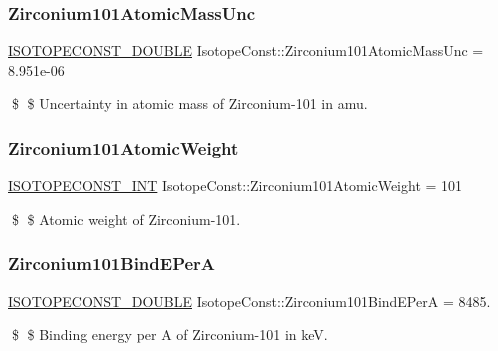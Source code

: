 \subsubsection{\texorpdfstring{Zirconium101\+Atomic\+Mass\+Unc}{Zirconium101AtomicMassUnc}}
{\footnotesize\ttfamily \mbox{\hyperlink{group___isotope_const-_macros_ga8f45a7272ce02c0b4c65c44636ed719a}{I\+S\+O\+T\+O\+P\+E\+C\+O\+N\+S\+T\+\_\+\+D\+O\+U\+B\+LE}} Isotope\+Const\+::\+Zirconium101\+Atomic\+Mass\+Unc = 8.\+951e-\/06}

\$ \$ Uncertainty in atomic mass of Zirconium-\/101 in amu. \mbox{\label{group___isotope_const-_zirconium-_zr101_ga49f5350ce9ca65b15c14497191d17c54}} 
\subsubsection{\texorpdfstring{Zirconium101\+Atomic\+Weight}{Zirconium101AtomicWeight}}
{\footnotesize\ttfamily \mbox{\hyperlink{group___isotope_const-_macros_ga5f18360b3e99483a35c32d789e62621c}{I\+S\+O\+T\+O\+P\+E\+C\+O\+N\+S\+T\+\_\+\+I\+NT}} Isotope\+Const\+::\+Zirconium101\+Atomic\+Weight = 101}

\$ \$ Atomic weight of Zirconium-\/101. \mbox{\label{group___isotope_const-_zirconium-_zr101_ga258fb9656a70efa66d4f0d09273a2ba3}} 
\subsubsection{\texorpdfstring{Zirconium101\+Bind\+E\+PerA}{Zirconium101BindEPerA}}
{\footnotesize\ttfamily \mbox{\hyperlink{group___isotope_const-_macros_ga8f45a7272ce02c0b4c65c44636ed719a}{I\+S\+O\+T\+O\+P\+E\+C\+O\+N\+S\+T\+\_\+\+D\+O\+U\+B\+LE}} Isotope\+Const\+::\+Zirconium101\+Bind\+E\+PerA = 8485.}

\$ \$ Binding energy per A of Zirconium-\/101 in keV. \mbox{\label{group___isotope_const-_zirconium-_zr101_gac1b41abcd80273d257e94b9877be92dc}} 

